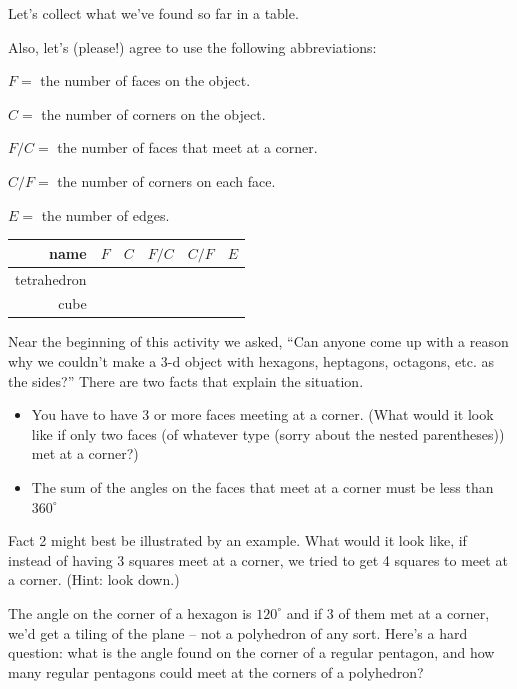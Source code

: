 Let's collect what we've found so far in a table.

Also, let's (please!) agree to use the following abbreviations:

$F =$ the number of faces on the object.

$C =$ the number of corners on the object.

$F/C =$ the number of faces that meet at a corner.

$C/F =$ the number of corners on each face.

$E =$ the number of edges.
\bigskip

\begin{tabular}{r|c|c|c|c|c} 
\bigstrut name & $F$ & $C$ & $F/C$ & $C/F$ & $E$ \\ \hline
\bigstrut tetrahedron & \hstrut & \hstrut & \hstrut & \hstrut & \hstrut \\ \hline
\bigstrut cube & & & & & 
\end{tabular}

\wbnewpage

Near the beginning of this activity we asked, ``Can anyone come up with a reason why we couldn't make a 3-d object with hexagons, heptagons, octagons, etc. as the sides?''  There are two facts that explain the situation.

\begin{itemize}
    \item[{\bf Fact 1:}] You have to have 3 or more faces meeting at a corner. \newline
    (What would it look like if only two faces (of whatever type (sorry about the nested parentheses)) met at a corner?)
    \item[{\bf Fact 2:}] The sum of the angles on the faces that meet at a corner must be less than $360^\circ$ \newline
\end{itemize}

Fact 2 might best be illustrated by an example.  What would it look like, if instead of having 3 squares meet at a corner, we tried to get 4 squares to meet at a corner. (Hint: look down.)

The angle on the corner of a hexagon is $120^\circ$ and if $3$ of them met at a corner, we'd get a tiling of the plane -- not a polyhedron of any sort.  Here's a hard question: what is the angle found on the corner of a regular pentagon, and how many regular pentagons could meet at the corners of a polyhedron?

\vspace{1in}


